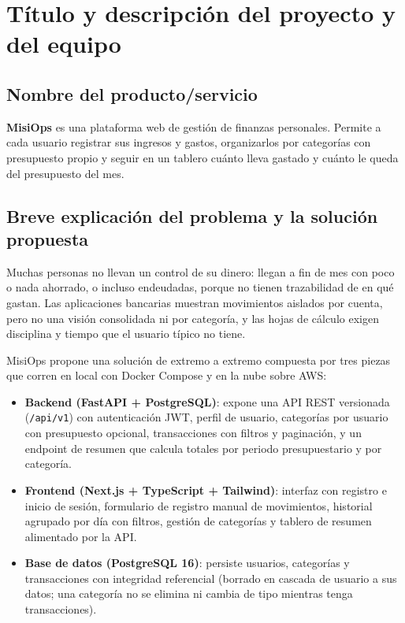 \section{Título y descripción del proyecto y del equipo}

\subsection{Nombre del producto/servicio}
\textbf{MisiOps} es una plataforma web de gestión de finanzas personales. Permite a cada usuario registrar sus ingresos y gastos, organizarlos por categorías con presupuesto propio y seguir en un tablero cuánto lleva gastado y cuánto le queda del presupuesto del mes.

\subsection{Breve explicación del problema y la solución propuesta}
Muchas personas no llevan un control de su dinero: llegan a fin de mes con poco o nada ahorrado, o incluso endeudadas, porque no tienen trazabilidad de en qué gastan. Las aplicaciones bancarias muestran movimientos aislados por cuenta, pero no una visión consolidada ni por categoría, y las hojas de cálculo exigen disciplina y tiempo que el usuario típico no tiene.

MisiOps propone una solución de extremo a extremo compuesta por tres piezas que corren en local con Docker Compose y en la nube sobre AWS:

\begin{itemize}
    \item \textbf{Backend (FastAPI + PostgreSQL)}: expone una API REST versionada (\texttt{/api/v1}) con autenticación JWT, perfil de usuario, categorías por usuario con presupuesto opcional, transacciones con filtros y paginación, y un endpoint de resumen que calcula totales por periodo presupuestario y por categoría.
    \item \textbf{Frontend (Next.js + TypeScript + Tailwind)}: interfaz con registro e inicio de sesión, formulario de registro manual de movimientos, historial agrupado por día con filtros, gestión de categorías y tablero de resumen alimentado por la API.
    \item \textbf{Base de datos (PostgreSQL 16)}: persiste usuarios, categorías y transacciones con integridad referencial (borrado en cascada de usuario a sus datos; una categoría no se elimina ni cambia de tipo mientras tenga transacciones).
\end{itemize}


